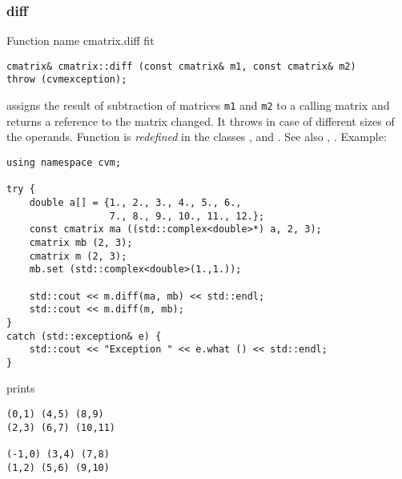 \subsubsection{diff}
Function%
\pdfdest name {cmatrix.diff} fit
\begin{verbatim}
cmatrix& cmatrix::diff (const cmatrix& m1, const cmatrix& m2)
throw (cvmexception);
\end{verbatim}
assigns the result of subtraction of
matrices \verb"m1" and \verb"m2" to a calling matrix
and returns a reference to
the matrix changed.
It throws  
in case of different sizes of the operands.
Function is \emph{redefined} in the classes
,  
and .
See also ,
.
Example:
\begin{Verbatim}
using namespace cvm;

try {
    double a[] = {1., 2., 3., 4., 5., 6.,
                  7., 8., 9., 10., 11., 12.};
    const cmatrix ma ((std::complex<double>*) a, 2, 3);
    cmatrix mb (2, 3);
    cmatrix m (2, 3);
    mb.set (std::complex<double>(1.,1.));

    std::cout << m.diff(ma, mb) << std::endl;
    std::cout << m.diff(m, mb);
}
catch (std::exception& e) {
    std::cout << "Exception " << e.what () << std::endl;
}
\end{Verbatim}
prints
\begin{Verbatim}
(0,1) (4,5) (8,9)
(2,3) (6,7) (10,11)

(-1,0) (3,4) (7,8)
(1,2) (5,6) (9,10)
\end{Verbatim}
\newpage




